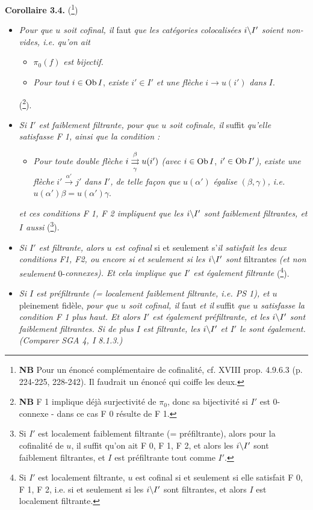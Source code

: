 \noindent\textbf{Corollaire 3.4.} (\footnote[55]{\textbf{NB} Pour un énoncé complémentaire de cofinalité, cf. XVIII prop. 4.9.6.3 (p. 224-225, 228-242). Il faudrait un énoncé qui coiffe les deux.})
\begin{itemize}[label={}]
\item[\textit{a)}] \textit{Pour que $u$ soit cofinal, il} faut \textit{que les catégories colocalisées $i\backslash I'$ soient non-vides, i.e. qu'on ait}

\begin{itemize}[label={}]
\item[\textit{F 0)}] $\pi_0(f)$ \textit{est bijectif.}
\item[\textit{F 1)}] \textit{Pour tout} $i \in \operatorname{Ob} I$, \textit{existe} $i' \in I'$ \textit{et une flèche} $i \longrightarrow u(i')$ \textit{dans} $I$.
\end{itemize}
(\footnote[56]{\textbf{NB} F 1 implique déjà surjectivité de $\pi_0$, donc sa bijectivité si $I'$ est 0-connexe - dans ce cas F 0 résulte de F 1.}).
\item[\textit{b)}] \textit{Si $I'$ est faiblement filtrante, pour que $u$ soit cofinale, il} suffit \textit{qu'elle satisfasse F 1, ainsi que la condition :}
\begin{itemize}[label={}]
\item[\textit{F 2)}] \textit{Pour toute double flèche} $i \mathrel{\overset{\beta}{\underset{\gamma}{\rightrightarrows}}} u(i')$ \textit{(avec} $i \in \operatorname{Ob} I$, $i' \in \operatorname{Ob} I'$\textit{),} \textit{existe une flèche} $i' \xrightarrow{\alpha'} j'$ \textit{dans} $I'$\textit{, de telle façon que} $u(\alpha')$ \textit{égalise} $(\beta, \gamma)$\textit{, i.e.} $u(\alpha')\beta = u(\alpha')\gamma$.
\end{itemize}
\textit{et ces conditions F 1, F 2 impliquent que les $i\backslash I'$ sont faiblement filtrantes, et $I$ aussi} (\footnote[57]{Si $I'$ est localement faiblement filtrante (= préfiltrante), alors pour la cofinalité de $u$, il suffit qu'on ait F 0, F 1, F 2, et alors les $i\backslash I'$ sont faiblement filtrantes, et $I$ est préfiltrante tout comme $I'$.}).

\item[\textit{c)}] \textit{Si $I'$ est filtrante, alors $u$ est cofinal} si et seulement s'\textit{il satisfait les deux conditions F1, F2, ou encore si et seulement si les $i\backslash I'$ sont} filtrantes \textit{(et non seulement} 0-\textit{connexes). Et cela implique que $I'$ est également filtrante} (\footnote[58]{Si $I'$ est localement filtrante, $u$ est cofinal si et seulement si elle satisfait F 0, F 1, F 2, i.e. si et seulement si les $i\backslash I'$ sont filtrantes, et alors $I$ est localement filtrante.}).
\item[\textit{d)}] \textit{Si $I$ est préfiltrante (= localement faiblement filtrante, i.e. PS 1), et $u$} pleinement fidèle, \textit{pour que $u$ soit cofinal, il} faut \textit{et il} suffit \textit{que $u$ satisfasse la condition F 1 plus haut. Et alors $I'$ est également préfiltrante, et les $i\backslash I'$ sont faiblement filtrantes. Si de plus $I$ est filtrante, les $i\backslash I'$ et $I'$ le sont également. (Comparer SGA 4, I 8.1.3.)}
\end{itemize}

